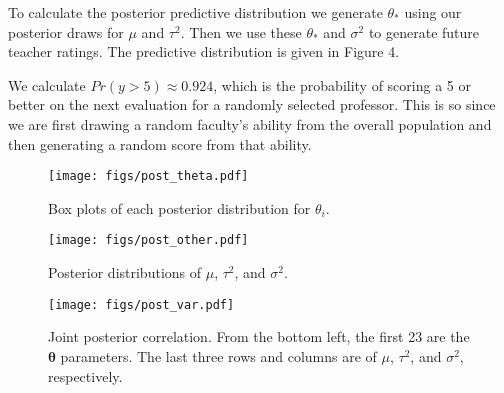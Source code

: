 \documentclass[12pt]{article}
\newcommand{\m}[1]{\mathbf{\bm{#1}}}
\begin{document}
\noindent To calculate the posterior predictive distribution we generate $\theta_*$ using our posterior draws for $\mu$ and $\tau^2$. Then we use these $\theta_*$ and $\sigma^2$ to generate future teacher ratings. The predictive distribution is given in Figure 4.
\bigskip

\noindent We calculate $Pr(y > 5) \approx 0.924$, which is the probability of scoring a 5 or better on the next evaluation for a randomly selected professor. This is so since we are first drawing a random faculty's ability from the overall population and then generating a random score from that ability.

\newpage
\begin{figure}[H]
\centering
\texttt{[image: figs/post\_theta.pdf]}
\caption{Box plots of each posterior distribution for $\theta_i$.}
\end{figure}

\begin{figure}[H]
\centering
\texttt{[image: figs/post\_other.pdf]}
\caption{Posterior distributions of $\mu$, $\tau^2$, and $\sigma^2$.}
\end{figure}

\begin{figure}[H]
\centering
\texttt{[image: figs/post\_var.pdf]}
\caption{Joint posterior correlation. From the bottom left, the first 23 are the $\m{\theta}$ parameters. The last three rows and columns are of $\mu$, $\tau^2$, and $\sigma^2$, respectively.}
\end{figure}
\end{document}
